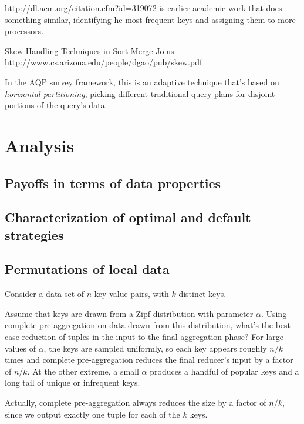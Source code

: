 \documentclass[12pt]{article}
\begin{document}
 http://dl.acm.org/citation.cfm?id=319072 is earlier academic work that does
 something similar, identifying he most frequent keys and assigning them to
 more processors.

 Skew Handling Techniques in Sort-Merge Joins: http://www.cs.arizona.edu/people/dgao/pub/skew.pdf

In the AQP survey framework, this is an adaptive technique that's based on \emph{horizontal partitioning}, picking different traditional query plans for disjoint portions of the query's data.

\pagebreak
\section{Analysis}

\subsection{Payoffs in terms of data properties}

\subsection{Characterization of optimal and default strategies}

\subsection{Permutations of local data}

Consider a data set of $n$ key-value pairs, with $k$ distinct keys.

Assume that keys are drawn from a Zipf distribution with parameter $\alpha$.
Using complete pre-aggregation on data drawn from this distribution, what's the best-case reduction of tuples in the input to the final aggregation phase?
For large values of $\alpha$, the keys are sampled uniformly, so each key appears roughly $n/k$ times and complete pre-aggregation reduces the final reducer's input by a factor of $n/k$.
At the other extreme, a small $\alpha$ produces a handful of popular keys and a long tail of unique or infrequent keys.

Actually, complete pre-aggregation always reduces the size by a factor of $n/k$, since we output exactly one tuple for each of the $k$ keys.

\end{document}
